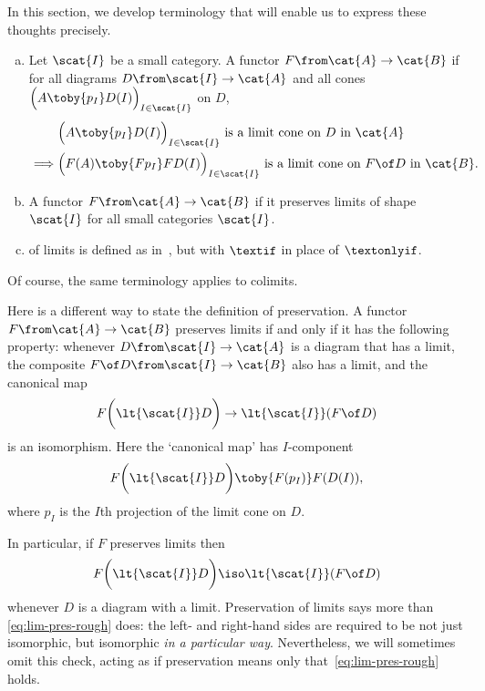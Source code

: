 In this section, we develop terminology that will enable us to express
these thoughts precisely.

\begin{defn}
\begin{enumerate}[(b)]
\item   
\label{defn:pres-lims-shape}
Let $\scat{I}$ be a small category.  A functor $F\from \cat{A} \to \cat{B}$
 if for all diagrams $D\from \scat{I} \to
\cat{A}$ and all cones $\Bigl(A \toby{p_I} D(I)\Bigr)_{I \in \scat{I}}$ on
$D$,
% 
\begin{align*}
        &
\Bigl(A \toby{p_I} D(I)\Bigr)_{I \in \scat{I}}
\text{ is a limit cone on } D \text{ in }\cat{A}\\
\implies        &
\Bigl(F(A) \toby{Fp_I} FD(I)\Bigr)_{I \in \scat{I}}
\text{ is a limit cone on } F \of D \text{ in }\cat{B}. 
\end{align*}

\item   
\label{defn:pres-lims-all}
A functor $F\from \cat{A} \to \cat{B}$  if it
preserves limits of shape $\scat{I}$ for all small categories $\scat{I}$.

\item 
{}%
%
%
%
of limits is defined as in~, but with $\textif$
in place of $\textonlyif$.
\end{enumerate}
\end{defn}
% 
Of course, the same terminology applies to colimits.

Here is a different way to state the definition of preservation.  A functor
$F\from \cat{A} \to \cat{B}$ preserves limits if and only if it has the
following property: whenever $D\from \scat{I} \to \cat{A}$ is a diagram
that has a limit, the composite $F \of D \from \scat{I} \to \cat{B}$ also
has a limit, and the canonical map
\[
F \biggl( \lt{\scat{I}} D \biggr)
\to
\lt{\scat{I}}(F \of D)
\]
is an isomorphism.  Here the `canonical map' has $I$-component 
\[
F \biggl( \lt{\scat{I}} D \biggr)
\toby{F(p_I)}
F(D(I)),
\]
where $p_I$ is the $I$th projection of the limit cone on $D$.

In particular, if $F$ preserves limits then
% 
\begin{equation}
\label{eq:lim-pres-rough}
F \biggl( \lt{\scat{I}} D \biggr)
\iso
\lt{\scat{I}}(F \of D)
\end{equation}
% 
whenever $D$ is a diagram with a limit.  Preservation of limits says more
than \eqref{eq:lim-pres-rough} does: the left- and right-hand sides are
required to be not just isomorphic, but isomorphic \emph{in a particular
  way}.  Nevertheless, we will sometimes omit this check, acting as if
preservation means only that~\eqref{eq:lim-pres-rough} holds.

